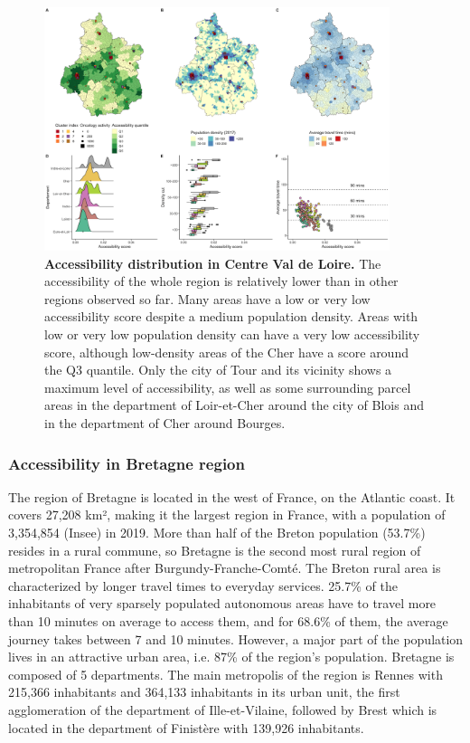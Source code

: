 \begin{figure}[h!]
    \includegraphics[width=0.9\textwidth]{images/camion/region_accessibility/accessibility_Centre-Val-de-Loire.png}
    \centering
    \caption{ \textbf{Accessibility distribution in Centre Val de Loire.} The
        accessibility of the whole region is relatively lower than in other
        regions observed so far. Many areas have a low or very low accessibility
        score despite a medium population density. Areas with low or very low
        population density can have a very low accessibility score, although
        low-density areas of the Cher have a score around the Q3 quantile. Only
        the city of Tour and its vicinity shows a maximum level of
        accessibility, as well as some surrounding parcel areas in the
        department of Loir-et-Cher around the city of Blois and in the
        department of Cher around Bourges. }
\end{figure}

\subsubsection{Accessibility in Bretagne region}

The region of Bretagne is located in the west of France, on the Atlantic coast.
It covers 27,208 km², making it the largest region in France, with a population
of 3,354,854 (Insee) in 2019. More than half of the Breton population (53.7\%)
resides in a rural commune, so Bretagne is the second most rural region of
metropolitan France after Burgundy-Franche-Comté. The Breton rural area is
characterized by longer travel times to everyday services. 25.7\% of the
inhabitants of very sparsely populated autonomous areas have to travel more than
10 minutes on average to access them, and for 68.6\% of them, the average
journey takes between 7 and 10 minutes. However, a major part of the population
lives in an attractive urban area, i.e. 87\% of the region's population.
Bretagne is composed of 5 departments. The main metropolis of the region is
Rennes with 215,366 inhabitants and 364,133 inhabitants in its urban unit, the
first agglomeration of the department of Ille-et-Vilaine, followed by Brest
which is located in the department of Finistère with 139,926 inhabitants.

